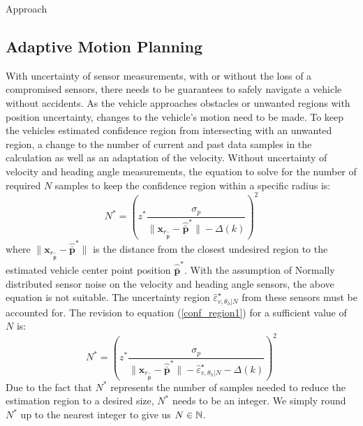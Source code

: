\begin{section}{Approach}
\subsection{Adaptive Motion Planning}
With uncertainty of sensor measurements, with or without the loss of a compromised sensors, there needs to be guarantees to safely navigate a vehicle without accidents. As the vehicle approaches obstacles or unwanted regions with position uncertainty, changes to the vehicle's motion need to be made. To keep the vehicles estimated confidence region from intersecting with an unwanted region, a change to the number of current and past data samples in the calculation as well as an adaptation of the velocity. Without uncertainty of velocity and heading angle measurements, the equation to solve for the number of required $N$ samples to keep the confidence region within a specific radius is:
    \begin{equation}
    \label{conf_region1}
	    N^* = \left(z^{*} \frac{ \sigma_p }{ {\lVert \bm{x}_{r_{\hat{\bar{\bm{p}}}}} - \hat{\bar{\bm{p}}}^* \rVert} -\Delta(k) } \right)^2
	\end{equation}
where $\lVert {\bm{x}_{r_{\hat{\bar{\bm{p}}}}}-\hat{\bar{\bm{p}}}^*} \rVert$ is the distance from the closest undesired region to the estimated vehicle center point position $\hat{\bar{\bm{p}}}^*$.
With the assumption of Normally distributed sensor noise on the velocity and heading angle sensors, the above equation is not suitable. The uncertainty region $\hat{\varepsilon}_{v,\theta_h|N}^{\star}$ from these sensors must be accounted for. The revision to equation (\ref{conf_region1}) for a sufficient value of $N$ is:
    \begin{equation}
	    N^* = \left(z^{*} \frac{ \sigma_p }{ {\lVert \bm{x}_{r_{\hat{\bar{\bm{p}}}}} - \hat{\bar{\bm{p}}}^* \rVert} -\hat{\varepsilon}_{v,\theta_h|N}^{\star}-\Delta(k) } \right)^2
	\end{equation}
Due to the fact that $N^*$ represents the number of samples needed to reduce the estimation region to a desired size, $N^*$ needs to be an integer. We simply round $N^*$ up to the nearest integer to give us $N \in \mathbb{N}$.


\end{section}
